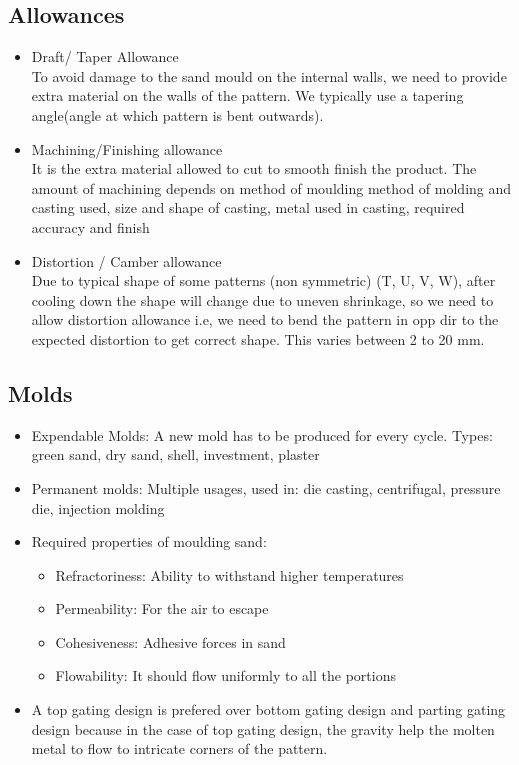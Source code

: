 \documentclass{article}
\begin{document}
\subsection{Allowances}
\begin{itemize}
	\item Draft/ Taper Allowance\\
		To avoid damage to the sand mould on the internal walls, we need to provide extra material on the walls of the pattern. We typically use a tapering angle(angle at which pattern is bent outwards).

	\item Machining/Finishing allowance\\
		It is the extra material allowed to cut to smooth finish the product. The amount of machining depends on method of moulding method of molding and casting used, size and shape of casting, metal used in casting, required accuracy and finish

	\item Distortion / Camber allowance\\
	 	Due to typical shape of some patterns (non symmetric) (T, U, V, W), after cooling down the shape will change due to uneven shrinkage, so we need to allow distortion allowance i.e, we need to bend the pattern in opp dir to the expected distortion to get correct shape. This varies between 2 to 20 mm.
\end{itemize}

\subsection{Molds}
\begin{itemize}
	\item Expendable Molds: A new mold has to be produced for every cycle. Types: green sand, dry sand, shell, investment, plaster
	\item Permanent molds: Multiple usages, used in: die casting, centrifugal, pressure die, injection molding

	\item Required properties of moulding sand:
	\begin{itemize}
		\item Refractoriness: Ability to withstand higher temperatures
		\item Permeability: For the air to escape
		\item Cohesiveness: Adhesive forces in sand
		\item Flowability: It should flow uniformly to all the portions
	\end{itemize}

\item A top gating design is prefered over bottom gating design and parting gating design because in the case of top gating design, the gravity help the molten metal to flow to intricate corners of the pattern.
\end{itemize}
\end{document}
